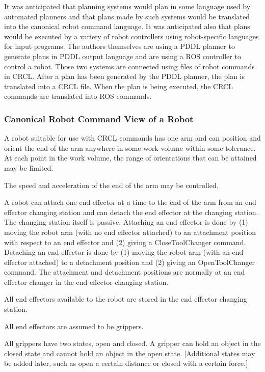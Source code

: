 It was anticipated that planning systems would plan in some language used
by automated planners and that plans made by such systems would be
translated into the canonical robot command language. It was anticipated
also that plans would be executed by a variety of robot controllers using
robot-specific languages for input programs. The authors themselves are
using a PDDL planner \cite{PDDL} to generate plans in PDDL output language
and are using a ROS controller \cite{ROS} to control a robot. Those two
systems are connected using files of robot commands in CRCL. After a plan
has been generated by the PDDL planner, the plan is translated into a CRCL
file. When the plan is being executed, the CRCL commands are translated
into ROS commands.\\

\subsubsection{Canonical Robot Command View of a Robot}

A robot suitable for use with CRCL commands has one arm and can position
and orient the end of the arm anywhere in some work volume within some
tolerance. At each point in the work volume, the range of orientations that
can be attained may be limited.

The speed and acceleration of the end of the arm may be controlled.

A robot can attach one end effector at a time to the end of the arm from an
end effector changing station and can detach the end effector at the
changing station. The changing station itself is passive.  Attaching an end
effector is done by (1) moving the robot arm (with no end effector
attached) to an attachment position with respect to an end effector and (2)
giving a CloseToolChanger command. Detaching an end effector is done by (1)
moving the robot arm (with an end effector attached) to a detachment
position and (2) giving an OpenToolChanger command. The attachment and
detachment positions are normally at an end effector changer in the end
effector changing station.

All end effectors available to the robot are stored in the end effector
changing station.

All end effectors are assumed to be grippers.

All grippers have two states, open and closed. A gripper can hold an
object in the closed state and cannot hold an object in the open
state. [Additional states may be added later, such as open a certain
distance or closed with a certain force.]

